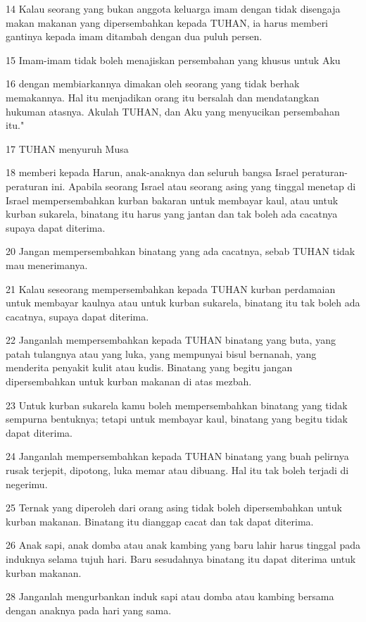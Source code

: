 \par 14 Kalau seorang yang bukan anggota keluarga imam dengan tidak disengaja makan makanan yang dipersembahkan kepada TUHAN, ia harus memberi gantinya kepada imam ditambah dengan dua puluh persen.
\par 15 Imam-imam tidak boleh menajiskan persembahan yang khusus untuk Aku
\par 16 dengan membiarkannya dimakan oleh seorang yang tidak berhak memakannya. Hal itu menjadikan orang itu bersalah dan mendatangkan hukuman atasnya. Akulah TUHAN, dan Aku yang menyucikan persembahan itu."
\par 17 TUHAN menyuruh Musa
\par 18 memberi kepada Harun, anak-anaknya dan seluruh bangsa Israel peraturan-peraturan ini. Apabila seorang Israel atau seorang asing yang tinggal menetap di Israel mempersembahkan kurban bakaran untuk membayar kaul, atau untuk kurban sukarela, binatang itu harus yang jantan dan tak boleh ada cacatnya supaya dapat diterima.
\par 20 Jangan mempersembahkan binatang yang ada cacatnya, sebab TUHAN tidak mau menerimanya.
\par 21 Kalau seseorang mempersembahkan kepada TUHAN kurban perdamaian untuk membayar kaulnya atau untuk kurban sukarela, binatang itu tak boleh ada cacatnya, supaya dapat diterima.
\par 22 Janganlah mempersembahkan kepada TUHAN binatang yang buta, yang patah tulangnya atau yang luka, yang mempunyai bisul bernanah, yang menderita penyakit kulit atau kudis. Binatang yang begitu jangan dipersembahkan untuk kurban makanan di atas mezbah.
\par 23 Untuk kurban sukarela kamu boleh mempersembahkan binatang yang tidak sempurna bentuknya; tetapi untuk membayar kaul, binatang yang begitu tidak dapat diterima.
\par 24 Janganlah mempersembahkan kepada TUHAN binatang yang buah pelirnya rusak terjepit, dipotong, luka memar atau dibuang. Hal itu tak boleh terjadi di negerimu.
\par 25 Ternak yang diperoleh dari orang asing tidak boleh dipersembahkan untuk kurban makanan. Binatang itu dianggap cacat dan tak dapat diterima.
\par 26 Anak sapi, anak domba atau anak kambing yang baru lahir harus tinggal pada induknya selama tujuh hari. Baru sesudahnya binatang itu dapat diterima untuk kurban makanan.
\par 28 Janganlah mengurbankan induk sapi atau domba atau kambing bersama dengan anaknya pada hari yang sama.
